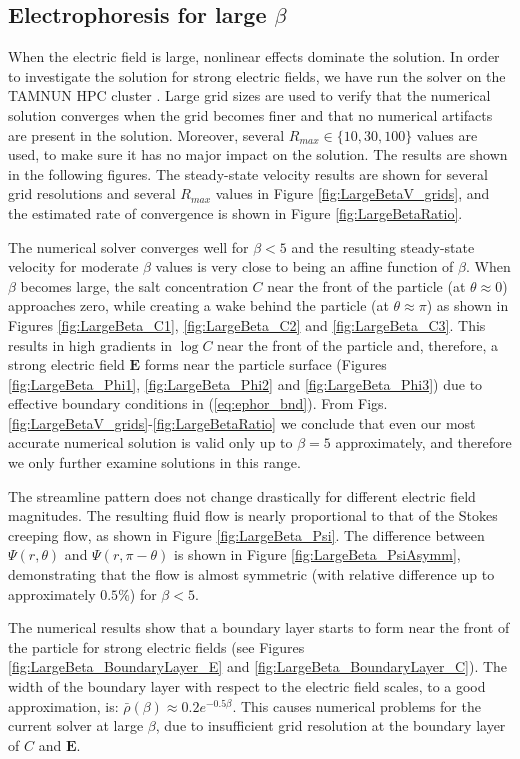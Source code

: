\documentclass[MSc,beforeExam]{iitcsthesis}
\newcommand\bE{\boldsymbol{E}}
\begin{document}
\subsection{Electrophoresis for large $\beta$ }
When the electric field is large, nonlinear effects dominate the solution.
In order to investigate the solution for strong electric fields, 
we have run the solver on the TAMNUN HPC cluster \cite{tamnun}.
Large grid sizes are used to verify that the numerical solution converges when the grid becomes finer and that no numerical artifacts are present in the solution.
Moreover, several $R_{max} \in \{10, 30, 100\}$ values are used, to make sure it has no major impact on the solution.
The results are shown in the following figures. 
The steady-state velocity results are shown for several grid resolutions and several $R_{max}$ values in Figure \ref{fig:LargeBetaV_grids}, and the estimated rate of convergence is shown in Figure \ref{fig:LargeBetaRatio}.

The numerical solver converges well for $\beta < 5$ and the resulting steady-state velocity 
for moderate $\beta$ values is very close to being an affine function of $\beta$.
When $\beta$ becomes large, the salt concentration $C$ near the front of the particle 
(at $\theta \approx 0$) approaches zero, while creating a wake behind the particle 
(at $\theta \approx \pi$) as shown in Figures \ref{fig:LargeBeta_C1}, \ref{fig:LargeBeta_C2} and
\ref{fig:LargeBeta_C3}.
This results in high gradients in $\log C$ near the front of the particle  and, therefore, a strong electric field $\bE$ forms near the particle surface (Figures \ref{fig:LargeBeta_Phi1}, \ref{fig:LargeBeta_Phi2} and \ref{fig:LargeBeta_Phi3}) due to effective boundary conditions in (\ref{eq:ephor_bnd}). 
From Figs. \ref{fig:LargeBetaV_grids}-\ref{fig:LargeBetaRatio} we conclude that even our most accurate numerical solution is valid only up to $\beta = 5$ approximately, and therefore we only further examine solutions in this range.

The streamline pattern does not change drastically for different electric field magnitudes. 
The resulting fluid flow is nearly proportional to that of the Stokes creeping flow, 
as shown in Figure \ref{fig:LargeBeta_Psi}. 
The difference between $\Psi(r, \theta)$ and $\Psi(r, \pi-\theta)$ is shown in Figure \ref{fig:LargeBeta_PsiAsymm}, demonstrating that the flow is almost symmetric (with relative
difference up to approximately $0.5\%$) for $\beta < 5$.

The numerical results show that a boundary layer starts to form near the front 
of the particle for strong electric fields (see Figures \ref{fig:LargeBeta_BoundaryLayer_E}
and \ref{fig:LargeBeta_BoundaryLayer_C}).
The width of the boundary layer with respect to the electric field scales, to a good approximation, is: $\bar\rho(\beta) \approx 0.2 e^{-0.5 \beta}$.
This causes numerical problems for the current solver at large $\beta$, due to insufficient
grid resolution at the boundary layer of $C$ and $\bE$.
\end{document}
